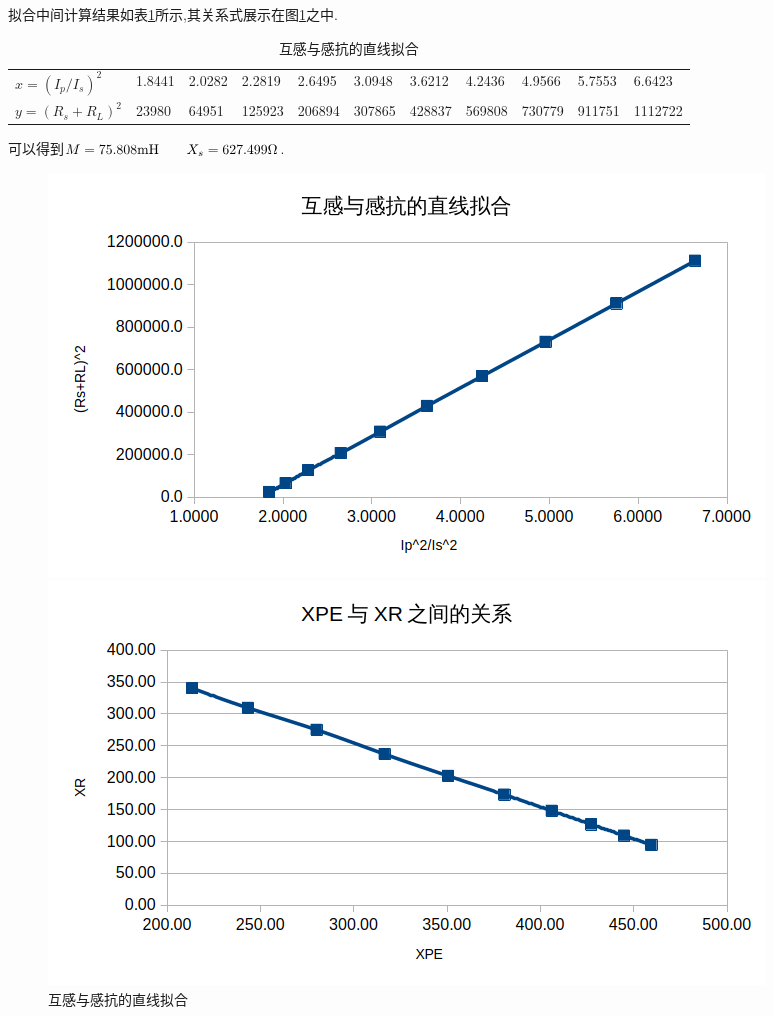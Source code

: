 \documentclass[UTF8,a4paper]{article}%
\begin{document}
拟合中间计算结果如表\ref{tb:linest}所示,其关系式展示在图\ref{fg:linest}之中.
\begin{table}[H]
    \centering
    \caption{互感与感抗的直线拟合}
    \label{tb:linest}
    \begin{tabular}{l|llllllllll}
        \hline
        $x=(I_p/I_s)^2$ & 1.8441 & 2.0282 & 2.2819 & 2.6495 & 3.0948 & 3.6212 & 4.2436 & 4.9566 & 5.7553 & 6.6423  \\
        $y=(R_s+R_L)^2$ & 23980  & 64951  & 125923 & 206894 & 307865 & 428837 & 569808 & 730779 & 911751 & 1112722 \\ \hline
    \end{tabular}
\end{table}
可以得到$M=75.808\unit{\mH}\qq{}X_s=627.499\unit{\ohm}$.
\begin{figure}[H]
    \centering
    \begin{minipage}[t]{0.45\linewidth}
        \centering
        \includegraphics[width=1.0\linewidth]{linest.png}
        \caption{互感与感抗的直线拟合}
        \label{fg:linest}
    \end{minipage}
    \begin{minipage}[t]{0.45\linewidth}
        \centering
        \includegraphics[width=1.0\linewidth]{xpe-xr.png}

\end{minipage}
\end{figure}
\end{document}

